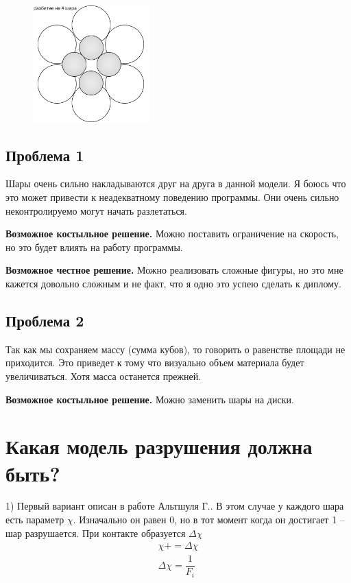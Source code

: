 \documentclass[a4paper]{article}
\begin{document}
\begin{figure}[h!]
	\centering
	\includegraphics[width=0.4\textwidth]{Component4}
	\label{pic:4balls}
	\caption{}
\end{figure} 

\subsection{Проблема 1}

Шары очень сильно накладываются друг на друга в данной модели.
Я боюсь что это может привести к неадекватному поведению программы.
Они очень сильно неконтролируемо могут начать разлетаться.

\textbf{Возможное костыльное решение.} 	Можно поставить ограничение на скорость, но это будет влиять на работу программы.

\textbf{Возможное честное решение.} Можно реализовать сложные фигуры, но это мне кажется довольно сложным и не факт, что я одно это успею сделать к диплому.

\subsection{Проблема 2}

Так как мы сохраняем массу (сумма кубов), то говорить о равенстве площади не приходится.
Это приведет к тому что визуально объем материала будет увеличиваться.
Хотя масса останется прежней.

\textbf{Возможное костыльное решение.} Можно заменить шары на диски.

\newpage

\section{Какая модель разрушения должна быть?}

1) 
Первый вариант описан в работе Альтшуля Г..
В этом случае у каждого шара есть параметр $\chi$.
Изначально он равен 0, но в тот момент когда он достигает 1 -- шар разрушается.
При контакте образуется $\Delta \chi$
\[
\begin{aligned}
\chi += \Delta \chi \\
\Delta \chi = \dfrac{1}{F_i}
\end{aligned}
\]
\end{document}

